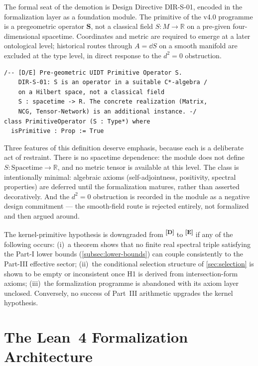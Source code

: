 \documentclass[12pt,a4paper,twoside]{article}
\theoremstyle{plain}
\theoremstyle{definition}
\theoremstyle{remark}
\newcommand{\catmark}[1]{\textsuperscript{\textsf{\textbf{[#1]}}}}
\begin{document}
The formal seat of the demotion is Design Directive DIR-S-01, encoded in
the formalization layer as a foundation module. The primitive of the v4.0
programme is a pregeometric operator $\mathbf S$, not a classical field
$S \colon M \to \mathbb R$ on a pre-given four-dimensional spacetime.
Coordinates and metric are required to emerge at a later ontological
level; historical routes through $A = \dd S$ on a smooth manifold are excluded at
the type level, in direct response to the $d^2 = 0$ obstruction.

\begin{lstlisting}
/-- [D/E] Pre-geometric UIDT Primitive Operator S.
    DIR-S-01: S is an operator in a suitable C*-algebra /
    on a Hilbert space, not a classical field
    S : spacetime -> R. The concrete realization (Matrix,
    NCG, Tensor-Network) is an additional instance. -/
class PrimitiveOperator (S : Type*) where
  isPrimitive : Prop := True
\end{lstlisting}

Three features of this definition deserve emphasis, because each is a
deliberate act of restraint. There is no spacetime dependence: the module
does not define $S \colon \mathrm{Spacetime} \to \mathbb R$, and no metric
tensor is available at this level. The class is intentionally minimal:
algebraic axioms (self-adjointness, positivity, spectral properties) are
deferred until the formalization matures, rather than asserted
decoratively. And the $d^2=0$ obstruction is recorded in the module as a
negative design commitment --- the smooth-field route is rejected
entirely, not formalized and then argued around.

\begin{killswitch}
The kernel-primitive hypothesis is downgraded from \catmark{D} to
\catmark{E} if any of the following occurs: (i)~a theorem shows that no
finite real spectral triple satisfying the Part-I lower bounds
(\cref{subsec:lower-bounds}) can couple consistently to the Part-III
effective sector; (ii)~the conditional selection structure of
\cref{sec:selection} is shown to be empty or inconsistent once H1 is
derived from intersection-form axioms; (iii)~the formalization programme
is abandoned with its axiom layer unclosed. Conversely, no success of
Part~III arithmetic upgrades the kernel hypothesis.
\end{killswitch}

\section{The Lean~4 Formalization Architecture}
\label{sec:lean-architecture}
\end{document}
